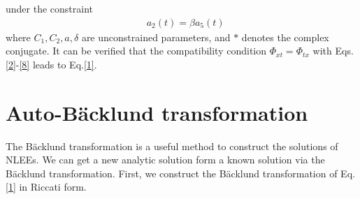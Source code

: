 \documentclass[12pt]{article}
\begin{document}
under the constraint
\begin{align}
  & a_{2}(t) = \beta a_{5}(t) \label{18}
\end{align}
where $C_{1}, C_{2}, a, \delta$ are unconstrained parameters, and $*$ denotes the complex conjugate. It can be verified that the compatibility condition $\Phi_{xt} = \Phi_{tx}$ with Eqs.\eqref{2}-\eqref{8} leads to Eq.\eqref{1}.

\section{Auto-B\"acklund transformation}
The B\"acklund transformation is a useful method to construct the solutions of NLEEs. We can get a new analytic solution form a known solution via the B\"acklund transformation\cite{7,10}. First, we construct the B\"acklund transformation of Eq.\eqref{1} in Riccati form.
\end{document}
